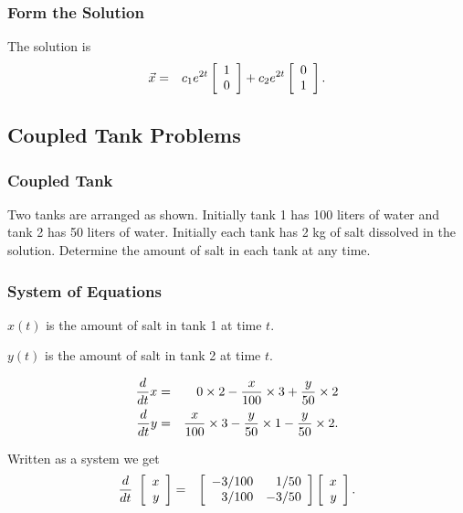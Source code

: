 \begin{frame}
  \frametitle{Form the Solution}
    
  The solution is 
  \begin{eqnarray*}
    \vec{x} & = & c_1 e^{2t} \vecTwo{1}{0} + c_2 e^{2t} \vecTwo{0}{1}.
  \end{eqnarray*}

\end{frame}


\subsection{Coupled Tank Problems}


\begin{frame}
  \frametitle{Coupled Tank}

  Two tanks are arranged as shown. Initially tank 1 has 100 liters of
  water and tank 2 has 50 liters of water. Initially each tank has 2
  kg of salt dissolved in the solution. Determine the amount of salt
  in each tank at any time.
  
\end{frame}


\begin{frame}
  \frametitle{System of Equations}

  $x(t)$ is the amount of salt in tank 1 at time $t$.

  $y(t)$ is the amount of salt in tank 2 at time $t$.

  \begin{eqnarray*}
    \deriv{x}{t} & = & 0\times 2 - 
    \frac{x}{100}\times 3 + \frac{y}{50}\times 2 \\
    \deriv{y}{t} & = & \frac{x}{100} \times 3 -
    \frac{y}{50} \times 1 - \frac{y}{50}\times 2.
  \end{eqnarray*}

  Written as a system we get
  \begin{eqnarray*}
    \deriv{~}{t} \vecTwo{x}{y} & = & 
    \arrayTwo{-3/100}{1/50}{3/100}{-3/50} \vecTwo{x}{y}.
  \end{eqnarray*}
  
\end{frame}


